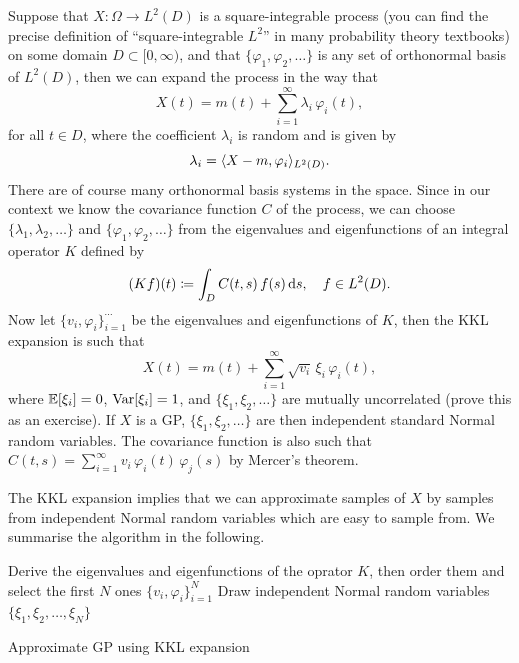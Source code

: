 \documentclass[]{article}
\begin{document}
Suppose that $X\colon \Omega \to L^2(D)$ is a square-integrable process (you can find the precise definition of ``square-integrable $L^2$'' in many probability theory textbooks) on some domain $D \subset [0, \infty)$, and that $\lbrace \varphi_1, \varphi_2, \ldots \rbrace$ is any set of orthonormal basis of $L^2(D)$, then we can expand the process in the way that
%
\begin{equation*}
	X(t) = m(t) + \sum_{i=1}^\infty \lambda_i \, \varphi_i(t),
\end{equation*}
%
for all $t\in D$, where the coefficient $\lambda_i$ is random and is given by
%
\begin{equation*}
	\lambda_i = \langle X - m, \varphi_i\rangle_{L^2(D)}.
\end{equation*}
%
There are of course many orthonormal basis systems in the space. Since in our context we know the covariance function $C$ of the process, we can choose $\lbrace \lambda_1, \lambda_2, \ldots \rbrace$ and $\lbrace \varphi_1, \varphi_2, \ldots \rbrace$ from the eigenvalues and eigenfunctions of an integral operator $K$ defined by
%
\begin{equation*}
	(K f)(t) \coloneqq \int_D C(t, s) \, f(s) \mathop{}\!\mathrm{d} s, \quad f \in L^2(D).
\end{equation*}
%
Now let $\lbrace v_i, \varphi_i \rbrace_{i=1}^{\cdots}$ be the eigenvalues and eigenfunctions of $K$, then the KKL expansion is such that
%
\begin{equation*}
	X(t) = m(t) + \sum_{i=1}^\infty \sqrt{v_i} \, \xi_i \, \varphi_i(t),
\end{equation*}
%
where $\expec{\xi_i} = 0$, $\varr{\xi_i} = 1$, and $\lbrace \xi_1, \xi_2, \ldots \rbrace$ are mutually uncorrelated (prove this as an exercise). If $X$ is a GP, $\lbrace \xi_1, \xi_2, \ldots \rbrace$ are then independent standard Normal random variables. The covariance function is also such that $C(t, s) = \sum_{i=1}^\infty v_i \, \varphi_i(t) \, \varphi_j(s)$ by Mercer's theorem.

The KKL expansion implies that we can approximate samples of $X$ by samples from independent Normal random variables which are easy to sample from. We summarise the algorithm in the following.

\begin{algorithm}
	\SetAlgoLined
	Derive the eigenvalues and eigenfunctions of the oprator $K$, then order them and select the first $N$ ones $\lbrace v_i, \varphi_i \rbrace_{i=1}^{N}$\;
	Draw independent Normal random variables $\lbrace \xi_1, \xi_2, \ldots, \xi_N\rbrace$\;
	\caption{Approximate GP using KKL expansion}
	\label{alg:kkt}
\end{algorithm}
\end{document}

